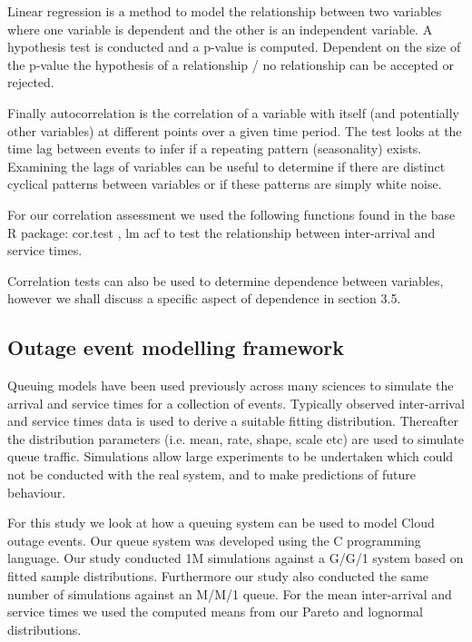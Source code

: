 \documentclass[5p]{elsarticle}
\begin{document}
Linear regression \cite{galton1890kinship} is a method to model the relationship between two variables where one variable is dependent and the other is an  independent variable. A hypothesis test is conducted and a p-value is computed. Dependent on the size of the p-value the hypothesis of a relationship / no relationship can be accepted or rejected.

Finally autocorrelation \cite{box1970distribution} is the correlation of a variable with itself (and potentially other variables) at different points over a given time period. The test looks at the time lag between events to infer if a repeating pattern (seasonality) exists. Examining the lags of variables can be useful to determine if there are distinct cyclical patterns between variables or if these patterns are simply white noise.

For our correlation assessment we used the following functions found in the base R package: cor.test \cite{PearSpearR}, lm \cite{lmR} acf \cite{acfR} to test the relationship between inter-arrival and service times.

Correlation tests can also be used to determine dependence between variables, however we shall discuss a specific aspect of dependence in section 3.5. 

\subsection{Outage event modelling framework}

Queuing models have been used previously across many sciences to simulate the arrival and service times for a collection of events. Typically observed inter-arrival and service times data is used to derive a suitable fitting distribution. Thereafter the distribution parameters (i.e. mean, rate, shape, scale etc) are used to simulate queue traffic. Simulations allow large experiments to be undertaken which could not be conducted with the real system, and to make predictions of future behaviour.

For this study we look at how a queuing system can be used to model Cloud outage events. Our queue system was developed using the C programming language. Our study conducted 1M simulations against a G/G/1 system based on fitted sample distributions. Furthermore our study also conducted the same number of simulations against an M/M/1 queue. For the mean inter-arrival and service times we used the computed means from our Pareto and lognormal distributions.
\end{document}
